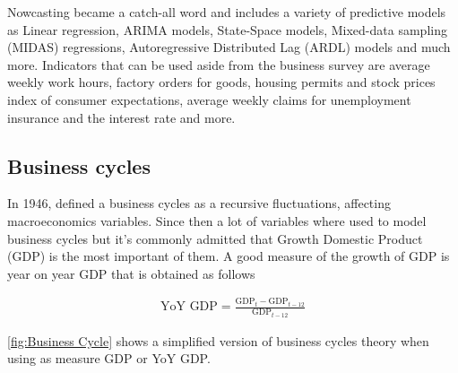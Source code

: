\documentclass[12pt,a4paper,oneside]{book}
\begin{document}
Nowcasting became a catch-all word and includes a variety of predictive models as Linear regression, ARIMA models, State-Space models, Mixed-data sampling (MIDAS) regressions, Autoregressive Distributed Lag (ARDL) models and much more.
Indicators that can be used aside from the business survey are average weekly work hours, factory orders for goods, housing permits and stock prices index of consumer expectations, average weekly claims for unemployment insurance and the interest rate and more.


\subsection{Business cycles}
\label{sec:Business Cycles}

In 1946, \citeauthor{mitchell_measuring_1946} defined a business cycles as a recursive fluctuations, affecting macroeconomics variables. Since then a lot of variables where used to model business cycles but it's commonly admitted that Growth Domestic Product (GDP) is the most important of them. 
A good measure of the growth of GDP is year on year GDP that is obtained as follows

\begin{eqnarray}
	\mbox{YoY GDP} = \frac{\mbox{GDP}_t - \mbox{GDP}_{t-12}}{\mbox{GDP}_{t-12}}      \label{eq:YoY GDP}
\end{eqnarray}

\autoref{fig:Business Cycle} shows a simplified version of business cycles theory when using as measure GDP or YoY GDP.
\end{document}
